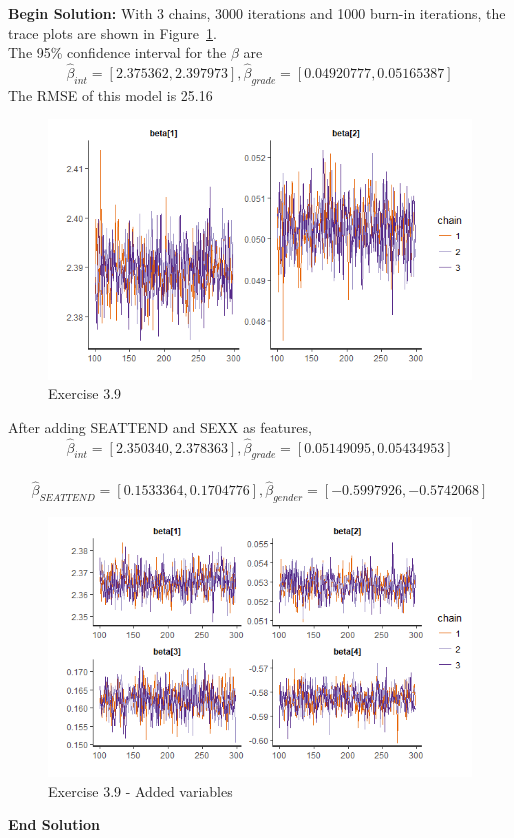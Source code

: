 \documentclass[twoside]{article}
\begin{document}
\textbf{Begin Solution:}
With 3 chains, 3000 iterations and 1000 burn-in iterations, the trace plots are shown in Figure~\ref{Feature: Grade}.\\
The 95\% confidence interval for the $\beta$ are
$$\hat{\beta}_{int}=[2.375362,2.397973],\hat{\beta}_{grade}=[0.04920777,0.05165387 ]$$
The RMSE of this model is 25.16\\
\begin{figure}[H]
\begin{center}
\includegraphics[width=\textwidth]{./MATLAB/3.9/traceplot39.png}
\end{center}
\caption{Exercise 3.9}
\label{Feature: Grade}
\end{figure}
After adding SEATTEND and SEXX as features, 
$$\hat{\beta}_{int}=[2.350340,2.378363],\hat{\beta}_{grade}=[0.05149095,0.05434953 ]$$\\$$\hat{\beta}_{SEATTEND}=[0.1533364,0.1704776],\hat{\beta}_{gender}=[-0.5997926,-0.5742068 ]$$
\begin{figure}[H]
\begin{center}
\includegraphics[width=\textwidth]{./MATLAB/3.9/traceplot39_2.png}
\end{center}
\caption{Exercise 3.9 - Added variables}
\label{Feature: Grade and some more}
\end{figure}
\textbf{End Solution}
  
\end{document}
